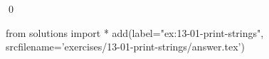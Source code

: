 
\begin{ex}
  \label{ex:13-01-print-strings}
  
  \qed
\end{ex}
\begin{python0}
from solutions import *
add(label="ex:13-01-print-strings",
    srcfilename='exercises/13-01-print-strings/answer.tex')
\end{python0}
